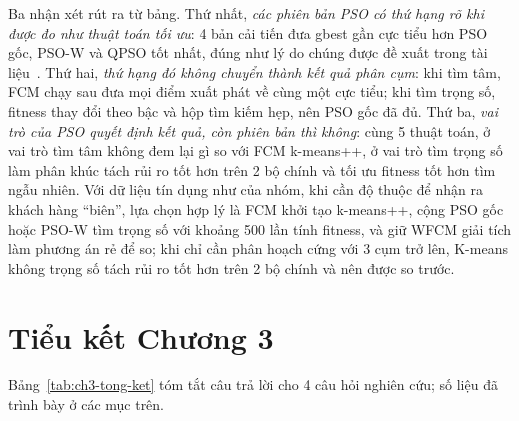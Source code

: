 Ba nhận xét rút ra từ bảng. Thứ nhất, \emph{các phiên bản PSO có thứ hạng rõ khi được đo như thuật toán tối ưu}: 4 bản cải
tiến đưa gbest gần cực tiểu hơn PSO gốc, PSO-W và QPSO tốt nhất, đúng như lý do chúng được đề xuất trong tài
liệu~\cite{shi1998inertia,qian2022psofcm,zhang2025qpsofcm}. Thứ hai, \emph{thứ hạng đó không chuyển thành kết quả phân cụm}: khi
tìm tâm, FCM chạy sau đưa mọi điểm xuất phát về cùng một cực tiểu; khi tìm trọng số, fitness thay đổi theo bậc và hộp tìm kiếm
hẹp, nên PSO gốc đã đủ. Thứ ba, \emph{vai trò của PSO quyết định kết quả, còn phiên bản thì không}: cùng 5 thuật toán, ở vai
trò tìm tâm không đem lại gì so với FCM k-means++, ở vai trò tìm trọng số làm phân khúc tách rủi ro tốt hơn trên 2 bộ chính
và tối ưu fitness tốt hơn tìm ngẫu nhiên. Với dữ liệu tín dụng như của nhóm, khi cần độ thuộc để nhận ra khách hàng
``biên'', lựa chọn hợp lý là FCM khởi tạo k-means++, cộng PSO gốc hoặc PSO-W tìm trọng số với khoảng 500 lần tính fitness,
và giữ WFCM giải tích làm phương án rẻ để so; khi chỉ cần phân hoạch cứng với 3 cụm trở lên, K-means không trọng số tách rủi
ro tốt hơn trên 2 bộ chính và nên được so trước.

\section*{Tiểu kết Chương 3}
\label{sec:tong-ket}

Bảng~\ref{tab:ch3-tong-ket} tóm tắt câu trả lời cho 4 câu hỏi nghiên cứu; số liệu đã trình bày ở các mục trên.

